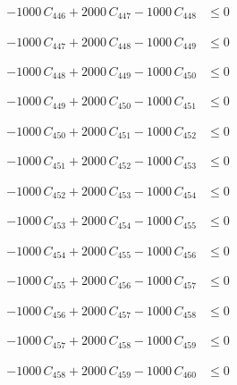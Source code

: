 \documentclass[a4paper,11pt]{article}
\begin{document}
\begin{align}
-1000\,C_{446} + 2000\,C_{447} - 1000\,C_{448} &\leq 0 \nonumber
\end{align}

\begin{align}
-1000\,C_{447} + 2000\,C_{448} - 1000\,C_{449} &\leq 0 \nonumber
\end{align}

\begin{align}
-1000\,C_{448} + 2000\,C_{449} - 1000\,C_{450} &\leq 0 \nonumber
\end{align}

\begin{align}
-1000\,C_{449} + 2000\,C_{450} - 1000\,C_{451} &\leq 0 \nonumber
\end{align}

\begin{align}
-1000\,C_{450} + 2000\,C_{451} - 1000\,C_{452} &\leq 0 \nonumber
\end{align}

\begin{align}
-1000\,C_{451} + 2000\,C_{452} - 1000\,C_{453} &\leq 0 \nonumber
\end{align}

\begin{align}
-1000\,C_{452} + 2000\,C_{453} - 1000\,C_{454} &\leq 0 \nonumber
\end{align}

\begin{align}
-1000\,C_{453} + 2000\,C_{454} - 1000\,C_{455} &\leq 0 \nonumber
\end{align}

\begin{align}
-1000\,C_{454} + 2000\,C_{455} - 1000\,C_{456} &\leq 0 \nonumber
\end{align}

\begin{align}
-1000\,C_{455} + 2000\,C_{456} - 1000\,C_{457} &\leq 0 \nonumber
\end{align}

\begin{align}
-1000\,C_{456} + 2000\,C_{457} - 1000\,C_{458} &\leq 0 \nonumber
\end{align}

\begin{align}
-1000\,C_{457} + 2000\,C_{458} - 1000\,C_{459} &\leq 0 \nonumber
\end{align}

\begin{align}
-1000\,C_{458} + 2000\,C_{459} - 1000\,C_{460} &\leq 0 \nonumber
\end{align}
\end{document}
